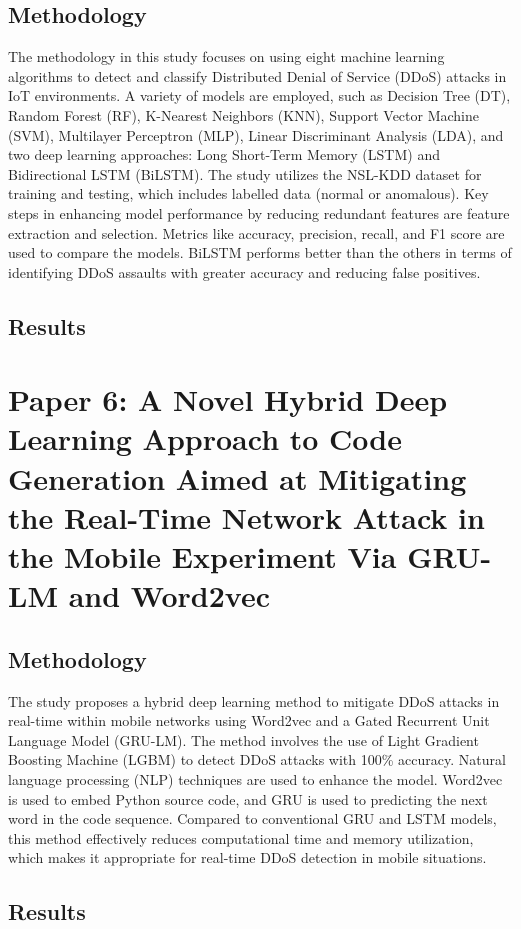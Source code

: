 \documentclass[a4paper, 12pt]{article}
\begin{document}
\subsection{Methodology}
The methodology in this study focuses on using eight machine learning algorithms to detect and classify Distributed Denial of Service (DDoS) attacks in IoT environments. A variety of models are employed, such as Decision Tree (DT), Random Forest (RF), K-Nearest Neighbors (KNN), Support Vector Machine (SVM), Multilayer Perceptron (MLP), Linear Discriminant Analysis (LDA), and two deep learning approaches: Long Short-Term Memory (LSTM) and Bidirectional LSTM (BiLSTM). The study utilizes the NSL-KDD dataset for training and testing, which includes labelled data (normal or anomalous). Key steps in enhancing model performance by reducing redundant features are feature extraction and selection. Metrics like accuracy, precision, recall, and F1 score are used to compare the models. BiLSTM performs better than the others in terms of identifying DDoS assaults with greater accuracy and reducing false positives. 

\subsection{Results}

\section{Paper 6: A Novel Hybrid Deep Learning Approach to Code Generation Aimed at Mitigating the Real-Time Network Attack in the Mobile Experiment Via GRU-LM and Word2vec}

\subsection{Methodology}
The study proposes a hybrid deep learning method to mitigate DDoS attacks in real-time within mobile networks using Word2vec and a Gated Recurrent Unit Language Model (GRU-LM). The method involves the use of Light Gradient Boosting Machine (LGBM) to detect DDoS attacks with 100\% accuracy. Natural language processing (NLP) techniques are used to enhance the model. Word2vec is used to embed Python source code, and GRU is used to predicting the next word in the code sequence. Compared to conventional GRU and LSTM models, this method effectively reduces computational time and memory utilization, which makes it appropriate for real-time DDoS detection in mobile situations. 

\subsection{Results}


{}
\end{document}
